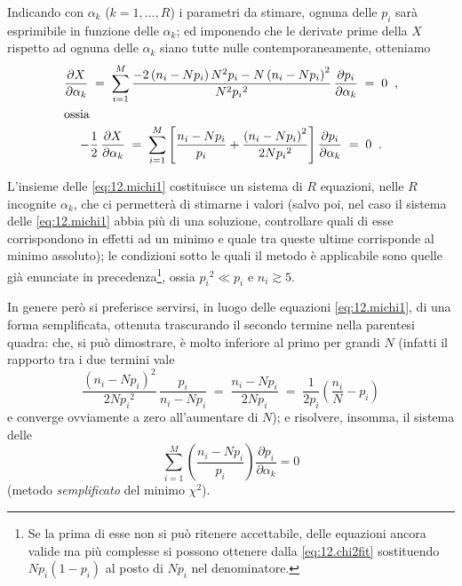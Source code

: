 Indicando con $\alpha_k$ ($k=1,\ldots,R$) i parametri da
stimare, ognuna delle $p_i$ sar\`a esprimibile in funzione
delle $\alpha_k$; ed imponendo che le derivate prime della
$X$ rispetto ad ognuna delle $\alpha_k$ siano tutte nulle
contemporaneamente, otteniamo
\begin{gather}
  \frac{\partial X}{\partial \alpha_k} \; = \;
    \sum_{i=1}^M \frac{-2 \left(n_i - N p_i \right) N^2
    p_i - N \left( n_i - N p_i \right)^2}{N^2 {p_i}^2}
    \, \frac{\partial p_i}{\partial \alpha_k}
    \; = \; 0 \;\; , \notag \\
  \intertext{ossia}
  - \frac{1}{2} \, \frac{\partial X}{\partial \alpha_k}
    \; = \; \sum_{i=1}^M \left[ \frac{n_i - N p_i}{p_i}
    + \frac{\left( n_i - N p_i \right)^2}{2 N {p_i}^2}
    \right] \frac{\partial p_i}{\partial \alpha_k} \; =
    \; 0 \;\; . \label{eq:12.michi1}
\end{gather}

L'insieme delle \eqref{eq:12.michi1} costituisce un sistema
di $R$ equazioni, nelle $R$ incognite $\alpha_k$, che ci
permetter\`a di stimarne i valori (salvo poi, nel caso il
sistema delle \eqref{eq:12.michi1} abbia pi\`u di una
soluzione, controllare quali di esse corrispondono in
effetti ad un minimo e quale tra queste ultime corrisponde
al minimo assoluto); le condizioni sotto le quali il metodo
\`e applicabile sono quelle gi\`a enunciate in
precedenza\/\footnote{Se la prima di esse non si pu\`o
  ritenere accettabile, delle equazioni ancora valide ma
  pi\`u complesse si possono ottenere dalla
  \eqref{eq:12.chi2fit} sostituendo $N p_i (1 - p_i)$ al
  posto di $N p_i$ nel denominatore.}, ossia ${p_i}^2 \ll
p_i$ e $n_i \gtrsim 5$.

In genere per\`o si preferisce servirsi, in luogo delle
equazioni \eqref{eq:12.michi1}, di una forma semplificata,
ottenuta trascurando il secondo termine nella parentesi
quadra: che, si pu\`o dimostrare, \`e molto inferiore al
primo per grandi $N$ (infatti il rapporto tra i due termini
vale
\begin{equation*}
  \frac{ \left( n_i - N p_i \right)^2 }{ 2 N {p_i}^2 } \,
    \frac{ p_i }{ n_i - N p_i } \; = \; \frac{ n_i - N p_i
    }{ 2 N p_i } \; = \; \frac{1}{2 p_i} \left(
    \frac{n_i}{N} - p_i \right)
\end{equation*}
e converge ovviamente a zero all'aumentare di $N$); e
risolvere, insomma, il sistema delle
\begin{equation} \label{eq:12.michi2}
  \sum_{i=1}^M \left( \frac{n_i - N p_i}{p_i} \right)
    \frac{\partial p_i}{\partial \alpha_k} = 0
\end{equation}
(metodo \emph{semplificato} del minimo $\chi^2$).

